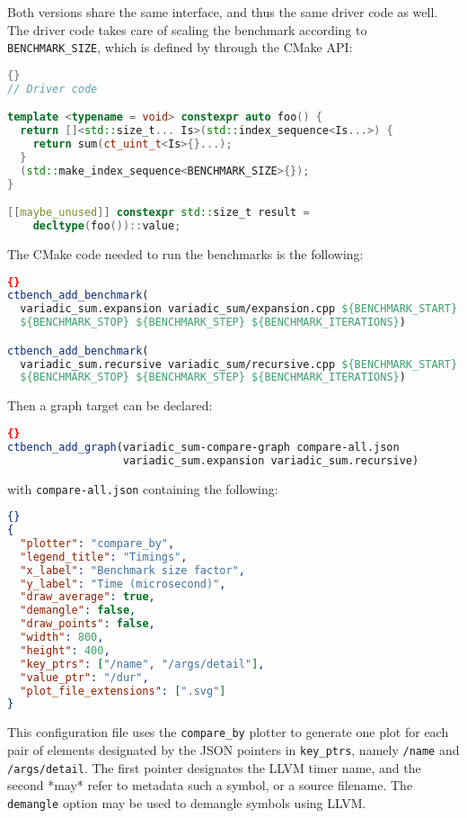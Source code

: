 \documentclass[../main]{subfiles}
\begin{document}
Both versions share the same interface, and thus the same driver code as well.
The driver code takes care of scaling the benchmark according to
\lstinline{BENCHMARK_SIZE}, which is defined by \ctbench through the CMake API:

\begin{lstlisting}[language=C++]{}
// Driver code

template <typename = void> constexpr auto foo() {
  return []<std::size_t... Is>(std::index_sequence<Is...>) {
    return sum(ct_uint_t<Is>{}...);
  }
  (std::make_index_sequence<BENCHMARK_SIZE>{});
}

[[maybe_unused]] constexpr std::size_t result =
    decltype(foo())::value;
\end{lstlisting}

The CMake code needed to run the benchmarks is the following:

\begin{lstlisting}[language=CMake]{}
ctbench_add_benchmark(
  variadic_sum.expansion variadic_sum/expansion.cpp ${BENCHMARK_START}
  ${BENCHMARK_STOP} ${BENCHMARK_STEP} ${BENCHMARK_ITERATIONS})

ctbench_add_benchmark(
  variadic_sum.recursive variadic_sum/recursive.cpp ${BENCHMARK_START}
  ${BENCHMARK_STOP} ${BENCHMARK_STEP} ${BENCHMARK_ITERATIONS})
\end{lstlisting}

Then a graph target can be declared:

\begin{lstlisting}[language=CMake]{}
ctbench_add_graph(variadic_sum-compare-graph compare-all.json
                  variadic_sum.expansion variadic_sum.recursive)
\end{lstlisting}

with \lstinline{compare-all.json} containing the following:

\begin{lstlisting}[language=JSON]{}
{
  "plotter": "compare_by",
  "legend_title": "Timings",
  "x_label": "Benchmark size factor",
  "y_label": "Time (microsecond)",
  "draw_average": true,
  "demangle": false,
  "draw_points": false,
  "width": 800,
  "height": 400,
  "key_ptrs": ["/name", "/args/detail"],
  "value_ptr": "/dur",
  "plot_file_extensions": [".svg"]
}
\end{lstlisting}

This configuration file uses the \lstinline{compare_by} plotter to generate one
plot for each pair of elements designated by the JSON pointers in
\lstinline{key_ptrs}, namely \lstinline{/name} and \lstinline{/args/detail}. The
first pointer designates the LLVM timer name, and the second *may* refer to
metadata such a \cpp symbol, or a \cpp source filename. The \lstinline{demangle}
option may be used to demangle \cpp symbols using LLVM.
\end{document}
